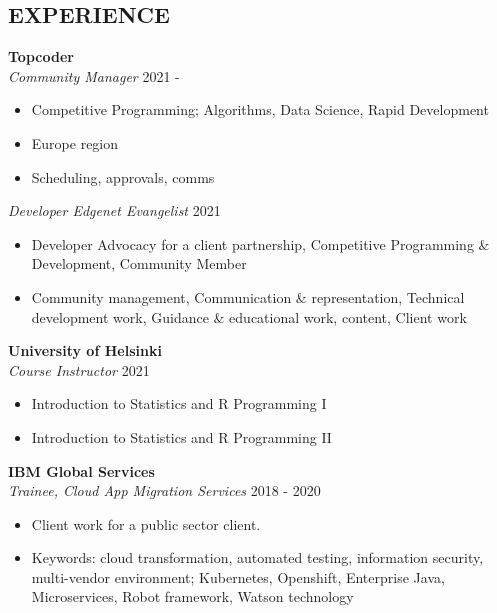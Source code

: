 \documentclass[margin, 10pt]{res} %
\begin{document}
\begin{resume}

%
%

 
\section{EXPERIENCE}
  
 \textbf{Topcoder}\\
 {\sl Community Manager} \hfill 2021 - \\
 \begin{itemize}
 	\item Competitive Programming; Algorithms, Data Science, Rapid Development
 	\item Europe region
 	\item Scheduling, approvals, comms
 \end{itemize}
 {\sl Developer Edgenet Evangelist} \hfill 2021 
 \begin{itemize} \itemsep -2pt %
 	\item Developer Advocacy for a client partnership, Competitive Programming \& \\ Development, Community Member
 	\item Community management, Communication \& representation, Technical development work, Guidance \& educational work, content, Client work
 \end{itemize}

\textbf{University of Helsinki}\\
{\sl Course Instructor} \hfill 2021 \\
\begin{itemize}
	\item Introduction to Statistics and R Programming I
	\item Introduction to Statistics and R Programming II
\end{itemize}
  
\textbf{IBM Global Services}\\
{\sl Trainee, Cloud App Migration Services} \hfill 2018 - 2020
\begin{itemize} \itemsep -2pt %
\item Client work for a public sector client.
\item Keywords: cloud transformation, automated testing, information security, multi-vendor environment; Kubernetes, Openshift, Enterprise Java, Microservices, Robot framework, Watson technology
\end{itemize}


\end{resume}
\end{document}
